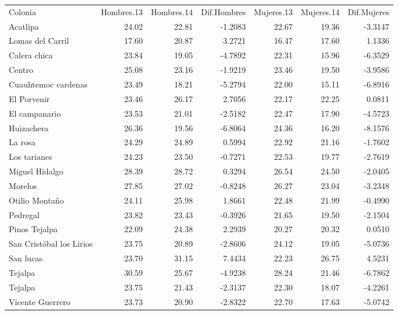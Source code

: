 \documentclass[]{article}
\begin{document}
\begin{longtable}[c]{@{}lrrrrrr@{}}
\toprule\addlinespace
Colonia & Hombres.13 & Hombres.14 & Dif.Hombres & Mujeres.13 &
Mujeres.14 & Dif.Mujeres
\\\addlinespace
\midrule\endhead
Acatlipa & 24.02 & 22.81 & -1.2083 & 22.67 & 19.36 & -3.3147
\\\addlinespace
Lomas del Carril & 17.60 & 20.87 & 3.2721 & 16.47 & 17.60 & 1.1336
\\\addlinespace
Calera chica & 23.84 & 19.05 & -4.7892 & 22.31 & 15.96 & -6.3529
\\\addlinespace
Centro & 25.08 & 23.16 & -1.9219 & 23.46 & 19.50 & -3.9586
\\\addlinespace
Cuauhtemoc cardenas & 23.49 & 18.21 & -5.2794 & 22.00 & 15.11 & -6.8916
\\\addlinespace
El Porvenir & 23.46 & 26.17 & 2.7056 & 22.17 & 22.25 & 0.0811
\\\addlinespace
El campanario & 23.53 & 21.01 & -2.5182 & 22.47 & 17.90 & -4.5723
\\\addlinespace
Huizachera & 26.36 & 19.56 & -6.8064 & 24.36 & 16.20 & -8.1576
\\\addlinespace
La rosa & 24.29 & 24.89 & 0.5994 & 22.92 & 21.16 & -1.7602
\\\addlinespace
Los tarianes & 24.23 & 23.50 & -0.7271 & 22.53 & 19.77 & -2.7619
\\\addlinespace
Miguel Hidalgo & 28.39 & 28.72 & 0.3294 & 26.54 & 24.50 & -2.0405
\\\addlinespace
Morelos & 27.85 & 27.02 & -0.8248 & 26.27 & 23.04 & -3.2348
\\\addlinespace
Otilio Montaño & 24.11 & 25.98 & 1.8661 & 22.48 & 21.99 & -0.4990
\\\addlinespace
Pedregal & 23.82 & 23.43 & -0.3926 & 21.65 & 19.50 & -2.1504
\\\addlinespace
Pinos Tejalpa & 22.09 & 24.38 & 2.2939 & 20.27 & 20.32 & 0.0510
\\\addlinespace
San Cristóbal los Lirios & 23.75 & 20.89 & -2.8606 & 24.12 & 19.05 &
-5.0736
\\\addlinespace
San lucas & 23.70 & 31.15 & 7.4434 & 22.23 & 26.75 & 4.5231
\\\addlinespace
Tejalpa & 30.59 & 25.67 & -4.9238 & 28.24 & 21.46 & -6.7862
\\\addlinespace
Tejalpa & 23.75 & 21.43 & -2.3137 & 22.30 & 18.07 & -4.2261
\\\addlinespace
Vicente Guerrero & 23.73 & 20.90 & -2.8322 & 22.70 & 17.63 & -5.0742

\end{longtable}
\end{document}
